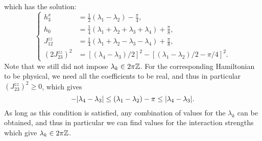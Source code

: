 which has the solution:
\begin{equation}
\begin{cases}%
    h_3^x &= \frac{1}{2}(\lambda_1 - \lambda_2) - \frac{\pi}{4}, \\
    h_0 &= \frac{1}{4}(\lambda_1 + \lambda_2 + \lambda_3 + \lambda_4) + \frac{\pi}{8}, \\
    J_{12}^{zz} &= \frac{1}{4}(\lambda_1 + \lambda_2 - \lambda_3 - \lambda_4) + \frac{\pi}{8}, \\
    (2J_{23}^{zz})^2 &=
    [(\lambda_4-\lambda_3)/2]^2 -
    [(\lambda_1-\lambda_2)/2 - \pi/4]^2.
\end{cases}
\end{equation}
Note that we still did not impose $\lambda_k\in2\pi{\mathbb{Z}}$. For the corresponding Hamiltonian to be physical, we need all the coefficients to be real, and thus in particular $(J_{23}^{zz})^2\ge0$, which gives
\begin{equation}
    -\abs{\lambda_4 -\lambda_3} \le
    (\lambda_1 - \lambda_2) - \pi \le \abs{\lambda_4 -\lambda_3}.
    \label{eq:GL:toffoli_lambdas_condition}
\end{equation}
As long as this condition is satisfied, any combination of values for the $\lambda_k$ can be obtained, and thus in particular we can find values for the interaction strengths which give $\lambda_k\in2\pi{\mathbb{Z}}$.

